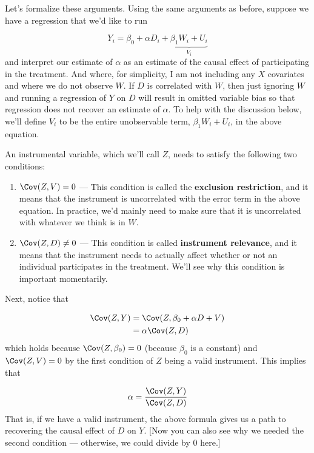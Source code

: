 \documentclass[
  letterpaper,
  DIV=11,
  numbers=noendperiod]{scrreprt}
\begin{document}
Let's formalize these arguments. Using the same arguments as before,
suppose we have a regression that we'd like to run

\[
  Y_i = \beta_0 + \alpha D_i + \underbrace{\beta_1 W_i + U_i}_{V_i}
\] and interpret our estimate of \(\alpha\) as an estimate of the causal
effect of participating in the treatment. And where, for simplicity, I
am not including any \(X\) covariates and where we do not observe \(W\).
If \(D\) is correlated with \(W\), then just ignoring \(W\) and running
a regression of \(Y\) on \(D\) will result in omitted variable bias so
that regression does not recover an estimate of \(\alpha\). To help with
the discussion below, we'll define \(V_i\) to be the entire unobservable
term, \(\beta_1 W_i + U_i\), in the above equation.

An instrumental variable, which we'll call \(Z\), needs to satisfy the
following two conditions:

\begin{enumerate}
\def\labelenumi{\arabic{enumi}.}
\item
  \(\Cov(Z,V) = 0\) --- This condition is called the \textbf{exclusion
  restriction}, and it means that the instrument is uncorrelated with
  the error term in the above equation. In practice, we'd mainly need to
  make sure that it is uncorrelated with whatever we think is in \(W\).
\item
  \(\Cov(Z,D) \neq 0\) --- This condition is called \textbf{instrument
  relevance}, and it means that the instrument needs to actually affect
  whether or not an individual participates in the treatment. We'll see
  why this condition is important momentarily.
\end{enumerate}

Next, notice that

\[
  \begin{aligned}
  \Cov(Z,Y) &= \Cov(Z,\beta_0 + \alpha D + V) \\
  &= \alpha \Cov(Z,D)
  \end{aligned}
\] which holds because \(\Cov(Z,\beta_0) = 0\) (because \(\beta_0\) is a
constant) and \(\Cov(Z,V)=0\) by the first condition of \(Z\) being a
valid instrument. This implies that

\[
  \alpha = \frac{\Cov(Z,Y)}{\Cov(Z,D)}
\] That is, if we have a valid instrument, the above formula gives us a
path to recovering the causal effect of \(D\) on \(Y\). {[}Now you can
also see why we needed the second condition --- otherwise, we could
divide by 0 here.{]}
\end{document}
